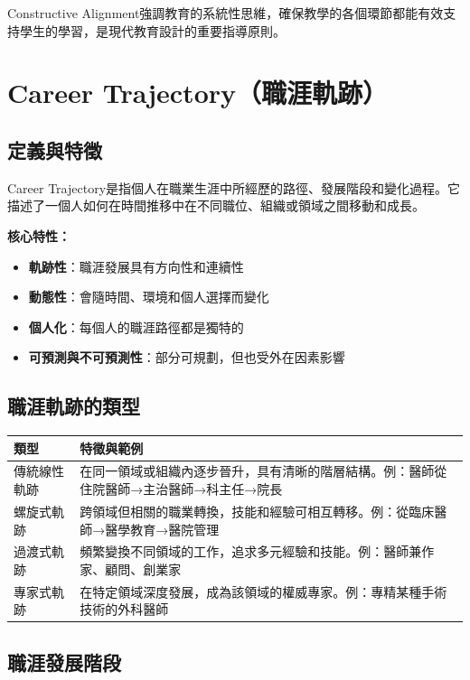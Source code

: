 \documentclass[12pt,a4paper]{article}
\newcommand{\note}[1]{
    \par
    \noindent
    \begin{tcolorbox}[
        colback=emergency_blue!5!white,
        colframe=emergency_blue,
        title=\textbf{重點提醒},
        fonttitle=\bfseries,
        boxrule=0.5pt,
        arc=3pt,
        left=6pt,
        right=6pt,
        top=6pt,
        bottom=6pt
    ]
    #1
    \end{tcolorbox}
}
\begin{document}
\note{
Constructive Alignment強調教育的系統性思維，確保教學的各個環節都能有效支持學生的學習，是現代教育設計的重要指導原則。
}

\section{Career Trajectory（職涯軌跡）}

\subsection{定義與特徵}

Career Trajectory是指個人在職業生涯中所經歷的路徑、發展階段和變化過程。它描述了一個人如何在時間推移中在不同職位、組織或領域之間移動和成長。

\textbf{核心特性：}
\begin{itemize}[nosep]
    \item \textbf{軌跡性}：職涯發展具有方向性和連續性
    \item \textbf{動態性}：會隨時間、環境和個人選擇而變化
    \item \textbf{個人化}：每個人的職涯路徑都是獨特的
    \item \textbf{可預測與不可預測性}：部分可規劃，但也受外在因素影響
\end{itemize}

\subsection{職涯軌跡的類型}

\begin{longtable}{p{4cm}p{10cm}}
\toprule
\textbf{類型} & \textbf{特徵與範例} \\
\midrule
\endhead
傳統線性軌跡 & 在同一領域或組織內逐步晉升，具有清晰的階層結構。例：醫師從住院醫師→主治醫師→科主任→院長 \\
螺旋式軌跡 & 跨領域但相關的職業轉換，技能和經驗可相互轉移。例：從臨床醫師→醫學教育→醫院管理 \\
過渡式軌跡 & 頻繁變換不同領域的工作，追求多元經驗和技能。例：醫師兼作家、顧問、創業家 \\
專家式軌跡 & 在特定領域深度發展，成為該領域的權威專家。例：專精某種手術技術的外科醫師 \\
\bottomrule
\end{longtable}

\subsection{職涯發展階段}
\end{document}
